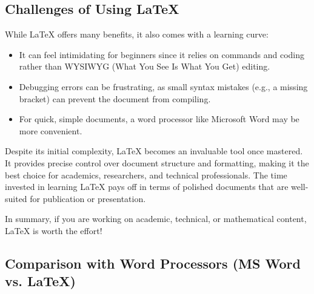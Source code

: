 \documentclass[12pt, oneside]{article}
\begin{document}
\subsection{Challenges of Using \LaTeX{}}

While \LaTeX{} offers many benefits, it also comes with a learning curve:
\begin{itemize}
    \item It can feel intimidating for beginners since it relies on commands and coding rather than WYSIWYG (What You See Is What You Get) editing.
    \item Debugging errors can be frustrating, as small syntax mistakes (e.g., a missing bracket) can prevent the document from compiling.
    \item For quick, simple documents, a word processor like Microsoft Word may be more convenient.
\end{itemize}

Despite its initial complexity, \LaTeX{} becomes an invaluable tool once mastered. It provides precise control over document structure and formatting, making it the best choice for academics, researchers, and technical professionals. The time invested in learning \LaTeX{} pays off in terms of polished documents that are well-suited for publication or presentation.

In summary, if you are working on academic, technical, or mathematical content, \LaTeX{} is worth the effort!
\subsection{Comparison with Word Processors (MS Word vs. \LaTeX{})}
\end{document}
